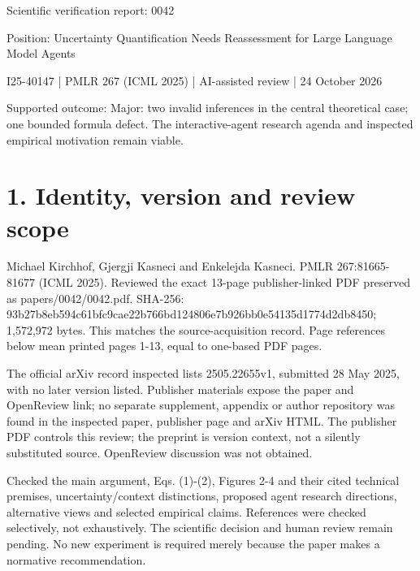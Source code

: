 \documentclass[10pt]{article}
\begin{document}
Scientific verification report: 0042\par
Position: Uncertainty Quantification Needs Reassessment for Large Language Model Agents\par
I25-40147 | PMLR 267 (ICML 2025) | AI-assisted review | 24 October 2026\par
Supported outcome: Major: two invalid inferences in the central theoretical case; one bounded formula defect. The interactive-agent research agenda and inspected empirical motivation remain viable.\par
\section*{1. Identity, version and review scope}
Michael Kirchhof, Gjergji Kasneci and Enkelejda Kasneci. PMLR 267:81665-81677 (ICML 2025). Reviewed the exact 13-page publisher-linked PDF preserved as papers/0042/0042.pdf. SHA-256: 93b27b8eb594c61bfc9cae22b766bd124806e7b926bb0e54135d1774d2db8450; 1,572,972 bytes. This matches the source-acquisition record. Page references below mean printed pages 1-13, equal to one-based PDF pages.\par
The official arXiv record inspected lists 2505.22655v1, submitted 28 May 2025, with no later version listed. Publisher materials expose the paper and OpenReview link; no separate supplement, appendix or author repository was found in the inspected paper, publisher page and arXiv HTML. The publisher PDF controls this review; the preprint is version context, not a silently substituted source. OpenReview discussion was not obtained.\par
Checked the main argument, Eqs. (1)-(2), Figures 2-4 and their cited technical premises, uncertainty/context distinctions, proposed agent research directions, alternative views and selected empirical claims. References were checked selectively, not exhaustively. The scientific decision and human review remain pending. No new experiment is required merely because the paper makes a normative recommendation.\par
\end{document}
